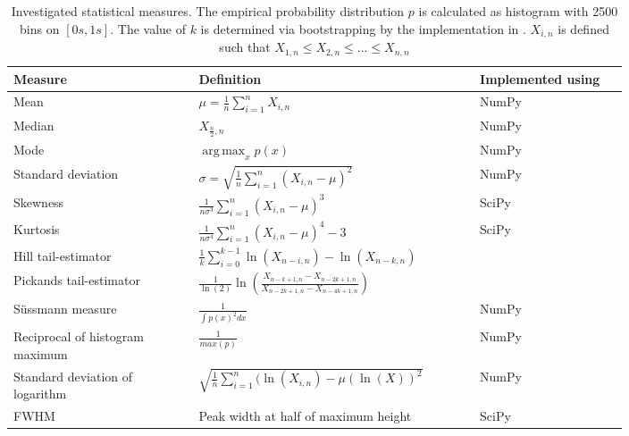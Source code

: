\documentclass[12pt,a4paper,automark, toc=bib]{scrreprt}
\DeclareMathOperator*{\argmax}{arg\,max}
\theoremstyle{definition}
\begin{document}
		\begin{table}
			\renewcommand{\arraystretch}{1.5}
			\centering
			\begin{tabular}{|m{0.25\linewidth}|m{0.35\linewidth}|m{0.2\linewidth}|}
				\hline
				Measure & Definition & Implemented using \\
				\hline
				\hline
				Mean & $\mu = \frac{1}{n}\sum_{i = 1}^n X_{i, n}$ &  NumPy \cite{numpy} \\
				\hline
				Median & $X_{\frac{n}{2}, n}$ &  NumPy \cite{numpy}\\
				\hline
				Mode & $\argmax_{x} p(x)$  & NumPy \cite{numpy}\\
				\hline
				Standard deviation & $\sigma = \sqrt{\frac{1}{n}\sum_{i = 1}^n ( X_{i, n} - \mu)^2}$ &  NumPy \cite{numpy}\\
				\hline
				Skewness & $\frac{1}{n \sigma^3}\sum_{i = 1}^n (X_{i, n} - \mu)^3$ &   SciPy \cite{Virtanen2020}\\
				\hline
				Kurtosis & $\frac{1}{n \sigma^4}\sum_{i = 1}^n (X_{i, n} - \mu)^4 - 3$ &   SciPy \cite{Virtanen2020}\\
				\hline
				Hill {tail-estimator} & $\frac{1}{k}\sum_{i=0}^{k - 1}{\ln(X_{n - i,n})} - \ln(X_{n - k,n})$ &  \cite{Voitalov2019}\\
				\hline
				Pickands {tail-estimator} & $ \frac{1}{\ln(2)} \ln\left(\frac{X_{n-k+1, n} - X_{n-2k+1, n}}{X_{n-2k+1, n} - X_{n-4k+1, n}}\right)$ &  \cite{Voitalov2019}\\
				\hline
				Süssmann measure & $ \frac{1}{\int p(x)^2 dx}$ &  NumPy \cite{numpy}\\
				\hline
				Reciprocal of histogram maximum& $\frac{1}{max(p)}$ & NumPy \cite{numpy}\\
				\hline
				Standard deviation of logarithm& $\sqrt{\frac{1}{n}\sum_{i = 1}^n ( \ln(X_{i, n}) - \mu(\ln(X))^2}$ & NumPy \cite{numpy}\\
				\hline
				FWHM & Peak width at half of maximum height  & SciPy \cite{Virtanen2020}\\
				\hline
			\end{tabular}
			\caption{Investigated statistical measures. The empirical probability distribution $p$ is calculated as histogram with 2500 bins on $[0s, 1s]$. The value of $k$ is determined via bootstrapping by the implementation in \cite{Voitalov2019}. $X_{i, n}$ is defined such that $X_{1, n} \leq X_{2, n} \leq ... \leq X_{n, n}$}
			\label{measure-tab}
		\end{table}
\end{document}

